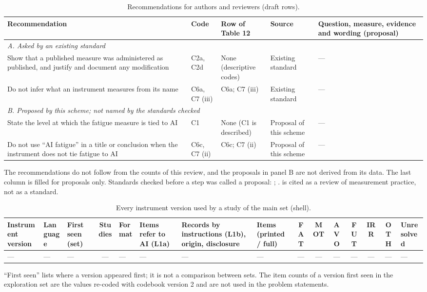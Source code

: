 \begin{table}[!htbp]
\centering
\caption{Recommendations for authors and reviewers (draft rows).}
\small
\begin{tabularx}{\linewidth}{XlXXX}
\toprule
Recommendation & Code & Row of Table 12 & Source & Question, measure, evidence and wording (proposal) \\
\midrule
\multicolumn{5}{l}{\emph{A. Asked by an existing standard}} \\
Show that a published measure was administered as published, and justify and document any modification & C2a, C2d & None (descriptive codes) & Existing standard \citep{elson2023} & --- \\
Do not infer what an instrument measures from its name & C6a, C7 (iii) & C6a; C7 (iii) & Existing standard \citep{elson2023} & --- \\
\multicolumn{5}{l}{\emph{B. Proposed by this scheme; not named by the standards checked}} \\
State the level at which the fatigue measure is tied to AI & C1 & None (C1 is described) & Proposal of this scheme & --- \\
Do not use ``AI fatigue'' in a title or conclusion when the instrument does not tie fatigue to AI & C6c, C7 (ii) & C6c; C7 (ii) & Proposal of this scheme & --- \\
\bottomrule
\end{tabularx}

\smallskip
\raggedright\footnotesize The recommendations do not follow from the counts of this review, and the proposals in
panel B are not derived from its data. The last column is filled for proposals only. Standards checked before
a step was called a proposal: \citet{elson2023}; . \citet{perrig2024} is cited as a review of
measurement practice, not as a standard.
\end{table}

\begin{landscape}
\begin{table}[!htbp]
\centering
\caption{Every instrument version used by a study of the main set (shell).}
\footnotesize
\begin{tabularx}{\linewidth}{XlXcXXXXccccccX}
\toprule
Instrument version & Language & First seen (set) & Studies & Format & Items refer to AI (L1a) & Records by instructions (L1b), origin, disclosure & Items (printed / full) & FAT & MOT & AVO & FUT & IRR & OTH & Unresolved \\
\midrule
--- & --- & --- & --- & --- & --- & --- & --- & --- & --- & --- & --- & --- & --- & --- \\
\bottomrule
\end{tabularx}

\smallskip
\raggedright\footnotesize ``First seen'' lists where a version appeared first; it is not a comparison between sets.
The item counts of a version first seen in the exploration set are the values re-coded with codebook version 2 and are
not used in the problem statements.
\end{table}
\end{landscape}

